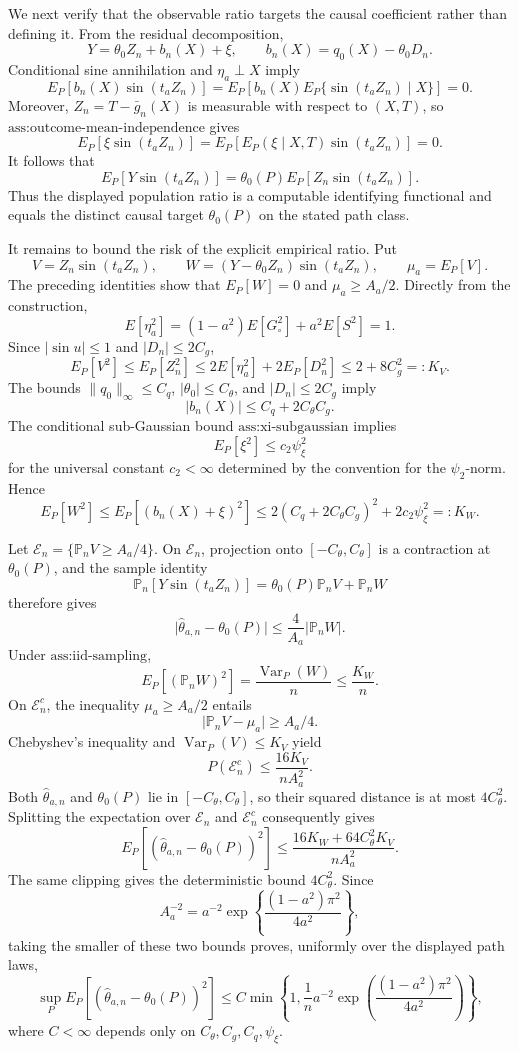 We next verify that the observable ratio targets the causal coefficient rather than defining it.  From the residual decomposition,
\[
 Y=\theta_0Z_n+b_n(X)+\xi,
 \qquad b_n(X)=q_0(X)-\theta_0D_n.
\]
Conditional sine annihilation and \(\eta_a\perp X\) imply
\[
 E_P[b_n(X)\sin(t_aZ_n)]
 =E_P\!\left[b_n(X)E_P\{\sin(t_aZ_n)\mid X\}\right]=0.
\]
Moreover, \(Z_n=T-\bar g_n(X)\) is measurable with respect to \((X,T)\), so \(\text{ass:outcome-mean-independence}\) gives
\[
 E_P[\xi\sin(t_aZ_n)]
 =E_P\!\left[E_P(\xi\mid X,T)\sin(t_aZ_n)\right]=0.
\]
It follows that
\[
 E_P[Y\sin(t_aZ_n)]
 =\theta_0(P)E_P[Z_n\sin(t_aZ_n)].
\]
Thus the displayed population ratio is a computable identifying functional and equals the distinct causal target \(\theta_0(P)\) on the stated path class.

It remains to bound the risk of the explicit empirical ratio.  Put
\[
 V=Z_n\sin(t_aZ_n),
 \qquad
 W=(Y-\theta_0Z_n)\sin(t_aZ_n),
 \qquad
 \mu_a=E_P[V].
\]
The preceding identities show that \(E_P[W]=0\) and \(\mu_a\geq A_a/2\).  Directly from the construction,
\[
 E[\eta_a^2]=(1-a^2)E[G_{\circ}^2]+a^2E[S^2]=1.
\]
Since \(\lvert\sin u\rvert\leq1\) and \(\lvert D_n\rvert\leq2C_g\),
\[
 E_P[V^2]
 \leq E_P[Z_n^2]
 \leq2E[\eta_a^2]+2E_P[D_n^2]
 \leq2+8C_g^2=:K_V.
\]
The bounds \(\lVert q_0\rVert_\infty\leq C_q\), \(\lvert\theta_0\rvert\leq C_\theta\), and \(\lvert D_n\rvert\leq2C_g\) imply
\[
 \lvert b_n(X)\rvert\leq C_q+2C_\theta C_g.
\]
The conditional sub-Gaussian bound \(\text{ass:xi-subgaussian}\) implies
\[
 E_P[\xi^2]\leq c_2\psi_\xi^2
\]
for the universal constant \(c_2<\infty\) determined by the convention for the \(\psi_2\)-norm.  Hence
\[
 E_P[W^2]
 \leq E_P[(b_n(X)+\xi)^2]
 \leq2(C_q+2C_\theta C_g)^2+2c_2\psi_\xi^2
 =:K_W.
\]

Let \(\mathcal E_n=\{\mathbb P_nV\geq A_a/4\}\).  On \(\mathcal E_n\), projection onto \([-C_\theta,C_\theta]\) is a contraction at \(\theta_0(P)\), and the sample identity
\[
 \mathbb P_n[Y\sin(t_aZ_n)]
 =\theta_0(P)\mathbb P_nV+\mathbb P_nW
\]
therefore gives
\[
 \lvert\widehat\theta_{a,n}-\theta_0(P)\rvert
 \leq\frac{4}{A_a}\lvert\mathbb P_nW\rvert.
\]
Under \(\text{ass:iid-sampling}\),
\[
 E_P[(\mathbb P_nW)^2]
 =\frac{\operatorname{Var}_P(W)}{n}
 \leq\frac{K_W}{n}.
\]
On \(\mathcal E_n^c\), the inequality \(\mu_a\geq A_a/2\) entails
\[
 \lvert\mathbb P_nV-\mu_a\rvert\geq A_a/4.
\]
Chebyshev's inequality and \(\operatorname{Var}_P(V)\leq K_V\) yield
\[
 P(\mathcal E_n^c)\leq\frac{16K_V}{nA_a^2}.
\]
Both \(\widehat\theta_{a,n}\) and \(\theta_0(P)\) lie in \([-C_\theta,C_\theta]\), so their squared distance is at most \(4C_\theta^2\).  Splitting the expectation over \(\mathcal E_n\) and \(\mathcal E_n^c\) consequently gives
\[
 E_P[(\widehat\theta_{a,n}-\theta_0(P))^2]
 \leq\frac{16K_W+64C_\theta^2K_V}{nA_a^2}.
\]
The same clipping gives the deterministic bound \(4C_\theta^2\).  Since
\[
 A_a^{-2}
 =a^{-2}\exp\!\left\{\frac{(1-a^2)\pi^2}{4a^2}\right\},
\]
taking the smaller of these two bounds proves, uniformly over the displayed path laws,
\[
 \sup_P E_P[(\widehat\theta_{a,n}-\theta_0(P))^2]
 \leq C\min\!\left\{
  1,\frac{1}{n}a^{-2}
  \exp\!\left(\frac{(1-a^2)\pi^2}{4a^2}\right)
 \right\},
\]
where \(C<\infty\) depends only on \(C_\theta,C_g,C_q,\psi_\xi\).

